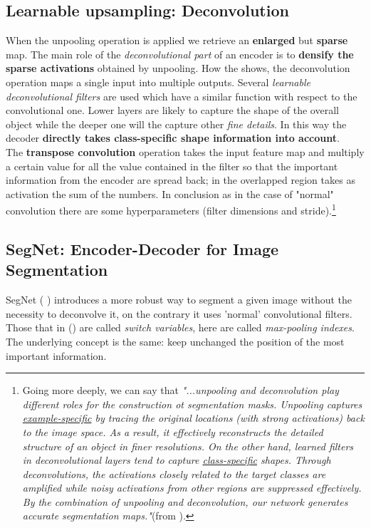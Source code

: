 \subsection{Learnable upsampling: Deconvolution}
When the unpooling operation is applied we retrieve an \textbf{enlarged} but \textbf{sparse} map. The main role of the \textit{deconvolutional part} of an encoder is to \textbf{densify the sparse activations} obtained by unpooling. How the  shows, the deconvolution operation maps a single input into multiple outputs. Several \textit{learnable deconvolutional filters} are used which have a similar function with respect to the convolutional one. Lower layers are likely to capture the shape of the overall object while the deeper one will the capture other \textit{fine details}. In this way the decoder \textbf{directly takes class-specific shape information into account}.\\
The \textbf{transpose convolution} operation takes the input feature map and multiply a certain value for all the value contained in the filter so that the important information from the encoder are spread back; in the overlapped region takes as activation the sum of the numbers. In conclusion as in the case of "normal" convolution there are some hyperparameters (filter dimensions and stride).\footnote{Going more deeply, we can say that \emph{"...unpooling and deconvolution play different roles for the construction ot segmentation masks. Unpooling captures \underline{example-specific} by tracing the original locations (with strong activations) back to the image space. As a result, it effectively reconstructs the detailed structure of an object in finer resolutions. On the other hand, learned filters in deconvolutional layers tend to capture \underline{class-specific} shapes. Through deconvolutions, the activations closely related to the target classes are amplified while noisy activations from other regions are suppressed effectively. By the combination of unpooling and deconvolution, our network generates accurate segmentation maps."}(from \citeauthor{noh2015learning} \cite{noh2015learning}).}

\subsection{SegNet: Encoder-Decoder for Image Segmentation}
SegNet (\citeauthor{badrinarayanan2017segnet} \cite{badrinarayanan2017segnet}) introduces a more robust way to segment a given image without the necessity to deconvolve it, on the contrary it uses 'normal' convolutional filters. Those that in \citeauthor{noh2015learning} (\cite{noh2015learning}) are called \textit{switch variables}, here are called \textit{max-pooling indexes}. The underlying concept is the same: keep unchanged the position of the most important information.

